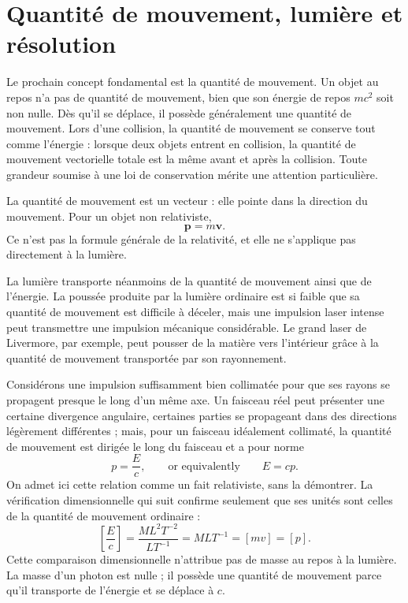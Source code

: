 \section{Quantité de mouvement, lumière et résolution}

Le prochain concept fondamental est la quantité de mouvement. Un objet au repos n’a pas de quantité de mouvement, bien que son énergie de repos \(mc^2\) soit non nulle. Dès qu’il se déplace, il possède généralement une quantité de mouvement. Lors d’une collision, la quantité de mouvement se conserve tout comme l’énergie : lorsque deux objets entrent en collision, la quantité de mouvement vectorielle totale est la même avant et après la collision. Toute grandeur soumise à une loi de conservation mérite une attention particulière.

La quantité de mouvement est un vecteur : elle pointe dans la direction du mouvement. Pour un objet non relativiste,
\begin{equation}
\mathbf p=m\mathbf v.
\end{equation}
Ce n’est pas la formule générale de la relativité, et elle ne s’applique pas directement à la lumière.

La lumière transporte néanmoins de la quantité de mouvement ainsi que de l’énergie. La poussée produite par la lumière ordinaire est si faible que sa quantité de mouvement est difficile à déceler, mais une impulsion laser intense peut transmettre une impulsion mécanique considérable. Le grand laser de Livermore, par exemple, peut pousser de la matière vers l’intérieur grâce à la quantité de mouvement transportée par son rayonnement.

Considérons une impulsion suffisamment bien collimatée pour que ses rayons se propagent presque le long d’un même axe. Un faisceau réel peut présenter une certaine divergence angulaire, certaines parties se propageant dans des directions légèrement différentes ; mais, pour un faisceau idéalement collimaté, la quantité de mouvement est dirigée le long du faisceau et a pour norme
\begin{equation}
p=\frac{E}{c},
\qquad\text{or equivalently}\qquad
E=cp.
\end{equation}
On admet ici cette relation comme un fait relativiste, sans la démontrer. La vérification dimensionnelle qui suit confirme seulement que ses unités sont celles de la quantité de mouvement ordinaire :
\begin{equation}
\left[\frac{E}{c}\right]
=
\frac{M L^2 T^{-2}}{L T^{-1}}
=
M L T^{-1}
=
[m v]
=
[p].
\end{equation}
Cette comparaison dimensionnelle n’attribue pas de masse au repos à la lumière. La masse d’un photon est nulle ; il possède une quantité de mouvement parce qu’il transporte de l’énergie et se déplace à \(c\).

